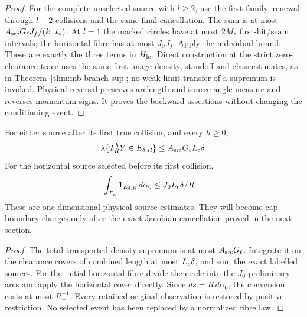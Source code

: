 \begin{proof}
For the complete unselected source with $l\ge2$, use the first
family, renewal through $l-2$ collisions and the same final
cancellation.  The sum is at most
$A_{\rm src}G_\ell J_f/(k_-t_*)$.  At $l=1$ the marked circles
have at most $2M_*$ first-hit/seam intervals; the horizontal fibre
has at most $J_0J_f$.  Apply the individual bound.  These are
exactly the three terms in $H_{\rm lc}$.  Direct construction at
the strict zero-clearance trace uses the same first-image density,
standoff and class estimates, as in
Theorem~\ref{thm:mb-branch-sup}; no weak-limit transfer of a
supremum is invoked.  Physical reversal preserves arclength and
source-angle measure and reverses momentum signs.  It proves the
backward assertions without changing the conditioning event.
\end{proof}

\begin{corollary}\label{cor:lc-source-mass}
For either source after its first true collision, and every $h\ge0$,
\begin{equation}\label{eq:lc-source-mass}
 \lambda\{T_R^hY\in E_{\delta,R}\}
                      \le A_{\rm src}G_\ell L_{\rm c}\delta.
\end{equation}
For the horizontal source selected before its first collision,
\begin{equation}\label{eq:lc-horizontal-initial}
 \int_{F_a}\mathbf1_{E_{\delta,R}}\,d\alpha_0
                       \le J_0L_{\rm c}\delta/R_-.
\end{equation}
These are one-dimensional physical source estimates.  They will
become cap-boundary charges only after the exact Jacobian
cancellation proved in the next section.
\end{corollary}
\begin{proof}
The total transported density supremum is at most
$A_{\rm src}G_\ell$.  Integrate it on the clearance covers of
combined length at most $L_{\rm c}\delta$, and sum the exact
labelled sources.  For the initial horizontal fibre divide the
circle into the $J_0$ preliminary arcs and apply the horizontal
cover directly.  Since $ds=R\,d\alpha_0$, the conversion costs
at most $R_-^{-1}$.  Every retained original observation is restored
by positive restriction.  No selected event has been replaced by
a normalized fibre law.
\end{proof}
